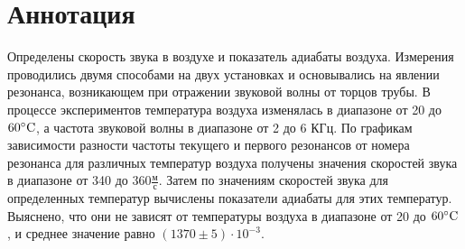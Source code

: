 \section*{Аннотация}

Определены скорость звука в воздухе и показатель адиабаты воздуха. Измерения проводились двумя способами на двух установках и основывались на явлении резонанса, возникающем при отражении звуковой волны от торцов трубы. В процессе экспериментов температура воздуха изменялась в диапазоне от 20 до $60\celsius$, а частота звуковой волны в диапазоне от 2 до 6 $\text{КГц}$. По графикам зависимости разности частоты текущего и первого резонансов от номера резонанса для различных температур воздуха получены значения скоростей звука в диапазоне от 340 до $360\frac{\text{м}}{\text{с}}$. Затем по значениям скоростей звука для определенных температур вычислены показатели адиабаты для этих температур. Выяснено, что они не зависят от температуры воздуха в диапазоне от 20 до $60\celsius$, и среднее значение равно $(1370 \pm 5)\cdot 10^{-3}$.